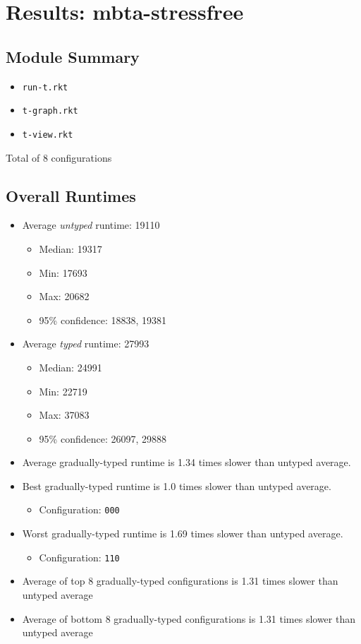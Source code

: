 \documentclass{article}
\newcommand{\mono}[1]{\texttt{#1}}
\begin{document}
\section{Results: mbta-stressfree}

\subsection{Module Summary}
\begin{itemize}
\item \mono{run-t.rkt}
\item \mono{t-graph.rkt}
\item \mono{t-view.rkt}\end{itemize}
Total of 8 configurations

\subsection{Overall Runtimes}
\begin{itemize}
\item Average \emph{untyped} runtime: 19110
  \begin{itemize}
  \item Median: 19317
  \item Min: 17693
  \item Max: 20682
  \item 95\% confidence: 18838, 19381
  \end{itemize}
\item Average \emph{typed} runtime: 27993
  \begin{itemize}
  \item Median: 24991
  \item Min: 22719
  \item Max: 37083
  \item 95\% confidence: 26097, 29888
  \end{itemize}
\item Average gradually-typed runtime is 1.34 times slower than untyped average.
\item Best gradually-typed runtime is 1.0 times slower than untyped average.
\begin{itemize}\item Configuration: \mono{000}\end{itemize}
\item Worst gradually-typed runtime is 1.69 times slower than untyped average.
\begin{itemize}\item Configuration: \mono{110}\end{itemize}
\item Average of top 8 gradually-typed configurations is 1.31 times slower than untyped average
\item Average of bottom 8 gradually-typed configurations is 1.31 times slower than untyped average
\end{itemize}
\end{document}
